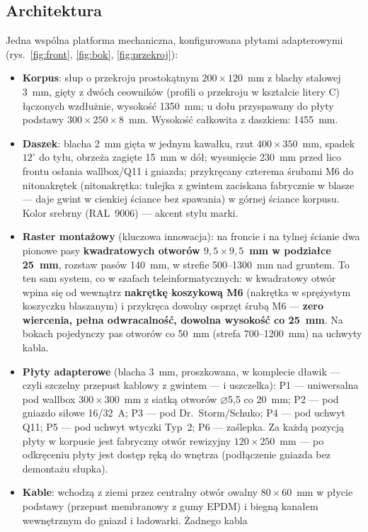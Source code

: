 \documentclass[11pt,a4paper]{article}
\begin{document}
\subsection{Architektura}
Jedna wspólna platforma mechaniczna, konfigurowana płytami adapterowymi (rys.~\ref{fig:front},
\ref{fig:bok}, \ref{fig:przekroj}):
\begin{itemize}
\item \textbf{Korpus}: słup o przekroju prostokątnym $200\times120$~mm z blachy stalowej 3~mm, gięty
z dwóch ceowników (profili o przekroju w kształcie litery C) łączonych wzdłużnie, wysokość 1350~mm;
u dołu przyspawany do płyty podstawy $300\times250\times8$~mm. Wysokość całkowita z daszkiem: 1455~mm.
\item \textbf{Daszek}: blacha 2~mm gięta w jednym kawałku, rzut $400\times350$~mm, spadek $12^\circ$
do tyłu, obrzeża zagięte 15~mm w dół; wysunięcie 230~mm przed lico frontu osłania wallbox/Q11
i gniazda; przykręcany czterema śrubami M6 do nitonakrętek (nitonakrętka: tulejka z gwintem
zaciskana fabrycznie w blasze --- daje gwint w cienkiej ściance bez spawania) w górnej ściance korpusu.
Kolor srebrny (RAL~9006) --- akcent stylu marki.
\item \textbf{Raster montażowy} (kluczowa innowacja): na froncie i na tylnej ścianie dwa pionowe pasy
\textbf{kwadratowych otworów $9{,}5\times9{,}5$~mm w podziałce 25~mm}, rozstaw pasów 140~mm, w strefie
500--1300~mm nad gruntem. To ten sam system, co w szafach teleinformatycznych: w kwadratowy otwór
wpina się od wewnątrz \textbf{nakrętkę koszykową M6} (nakrętka w sprężystym koszyczku blaszanym)
i przykręca dowolny osprzęt śrubą M6 --- \textbf{zero wiercenia, pełna odwracalność, dowolna wysokość
co 25~mm}. Na bokach pojedynczy pas otworów co 50~mm (strefa 700--1200~mm) na uchwyty kabla.
\item \textbf{Płyty adapterowe} (blacha 3~mm, proszkowana, w komplecie dławik --- czyli szczelny
przepust kablowy z gwintem --- i uszczelka): P1 --- uniwersalna pod wallbox $300\times300$~mm z siatką
otworów $\varnothing$5{,}5 co 20~mm; P2 --- pod gniazdo siłowe 16/32~A; P3 --- pod Dr.~Storm/Schuko;
P4 --- pod uchwyt Q11; P5 --- pod uchwyt wtyczki Typ~2; P6 --- zaślepka. Za każdą pozycją płyty
w korpusie jest fabryczny otwór rewizyjny $120\times250$~mm --- po odkręceniu płyty jest dostęp ręką
do wnętrza (podłączenie gniazda bez demontażu słupka).
\item \textbf{Kable}: wchodzą z ziemi przez centralny otwór owalny $80\times60$~mm w płycie podstawy
(przepust membranowy z gumy EPDM) i biegną kanałem wewnętrznym do gniazd i ładowarki. Żadnego kabla

\end{itemize}
\end{document}
